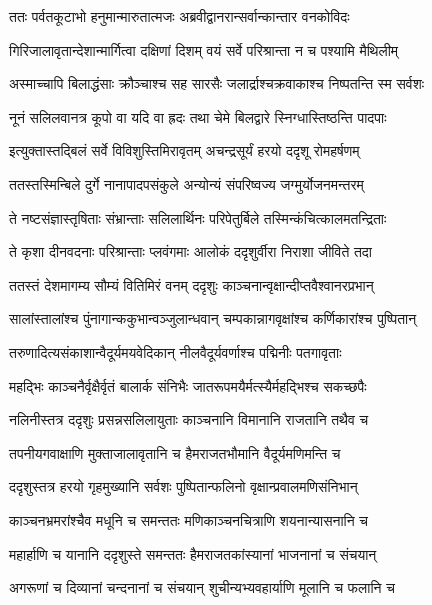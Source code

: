 \twolineshloka
{ततः पर्वतकूटाभो हनुमान्मारुतात्मजः}
{अब्रवीद्वानरान्सर्वान्कान्तार वनकोविदः} %

\twolineshloka
{गिरिजालावृतान्देशान्मार्गित्वा दक्षिणां दिशम्}
{वयं सर्वे परिश्रान्ता न च पश्यामि मैथिलीम्} %

\twolineshloka
{अस्माच्चापि बिलाद्धंसाः क्रौञ्चाश्च सह सारसैः}
{जलार्द्राश्चक्रवाकाश्च निष्पतन्ति स्म सर्वशः} %

\twolineshloka
{नूनं सलिलवानत्र कूपो वा यदि वा ह्रदः}
{तथा चेमे बिलद्वारे स्निग्धास्तिष्ठन्ति पादपाः} %

\twolineshloka
{इत्युक्तास्तद्बिलं सर्वे विविशुस्तिमिरावृतम्}
{अचन्द्रसूर्यं हरयो ददृशू रोमहर्षणम्} %

\twolineshloka
{ततस्तस्मिन्बिले दुर्गे नानापादपसंकुले}
{अन्योन्यं संपरिष्वज्य जग्मुर्योजनमन्तरम्} %

\twolineshloka
{ते नष्टसंज्ञास्तृषिताः संभ्रान्ताः सलिलार्थिनः}
{परिपेतुर्बिले तस्मिन्कंचित्कालमतन्द्रिताः} %

\twolineshloka
{ते कृशा दीनवदनाः परिश्रान्ताः प्लवंगमाः}
{आलोकं ददृशुर्वीरा निराशा जीविते तदा} %

\twolineshloka
{ततस्तं देशमागम्य सौम्यं वितिमिरं वनम्}
{ददृशुः काञ्चनान्वृक्षान्दीप्तवैश्वानरप्रभान्} %

\twolineshloka
{सालांस्तालांश्च पुंनागान्ककुभान्वञ्जुलान्धवान्}
{चम्पकान्नागवृक्षांश्च कर्णिकारांश्च पुष्पितान्} %

\twolineshloka
{तरुणादित्यसंकाशान्वैदूर्यमयवेदिकान्}
{नीलवैदूर्यवर्णाश्च पद्मिनीः पतगावृताः} %

\twolineshloka
{महद्भिः काञ्चनैर्वृक्षैर्वृतं बालार्क संनिभैः}
{जातरूपमयैर्मत्स्यैर्महद्भिश्च सकच्छपैः} %

\twolineshloka
{नलिनीस्तत्र ददृशुः प्रसन्नसलिलायुताः}
{काञ्चनानि विमानानि राजतानि तथैव च} %

\twolineshloka
{तपनीयगवाक्षाणि मुक्ताजालावृतानि च}
{हैमराजतभौमानि वैदूर्यमणिमन्ति च} %

\twolineshloka
{ददृशुस्तत्र हरयो गृहमुख्यानि सर्वशः}
{पुष्पितान्फलिनो वृक्षान्प्रवालमणिसंनिभान्} %

\twolineshloka
{काञ्चनभ्रमरांश्चैव मधूनि च समन्ततः}
{मणिकाञ्चनचित्राणि शयनान्यासनानि च} %

\twolineshloka
{महार्हाणि च यानानि ददृशुस्ते समन्ततः}
{हैमराजतकांस्यानां भाजनानां च संचयान्} %

\twolineshloka
{अगरूणां च दिव्यानां चन्दनानां च संचयान्}
{शुचीन्यभ्यवहार्याणि मूलानि च फलानि च} %


